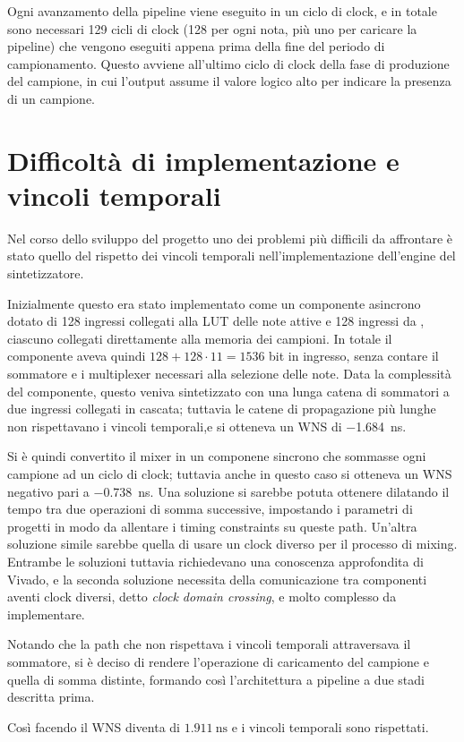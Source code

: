Ogni avanzamento della pipeline viene eseguito in un ciclo di clock,
e in totale sono necessari 129 cicli di clock
(128 per ogni nota, più uno per caricare la pipeline) che vengono eseguiti
appena prima della fine del periodo di campionamento.
Questo avviene all'ultimo ciclo di clock della fase di produzione del
campione, in cui l'output  assume il valore
logico alto per indicare la presenza di un campione.

\section{Difficoltà di implementazione e vincoli temporali}
\label{sec:timing_impl}
Nel corso dello sviluppo del progetto uno dei problemi più difficili da affrontare
è stato quello del rispetto dei vincoli temporali nell'implementazione dell'engine
del sintetizzatore.

Inizialmente questo era stato implementato come un componente asincrono dotato di 
128 ingressi collegati alla LUT delle note attive e 128 ingressi da ,
ciascuno collegati direttamente alla memoria dei campioni.
In totale il componente aveva quindi $128+128\cdot11 = 1536$ bit in ingresso, senza contare
il sommatore e i multiplexer necessari alla selezione delle note.
Data la complessità del componente, questo veniva sintetizzato con una lunga catena
di sommatori a due ingressi collegati in cascata; tuttavia le catene di propagazione più lunghe
non rispettavano i vincoli temporali,e si otteneva un WNS di \SI{-1.684}{\nano\second}.

Si è quindi convertito il mixer in un componene sincrono che sommasse ogni campione
ad un ciclo di clock; tuttavia anche in questo caso si otteneva un WNS negativo pari
a \SI{-0.738}{\nano\second}.
Una soluzione si sarebbe potuta ottenere dilatando il tempo tra due operazioni di somma
successive, impostando i parametri di progetti in modo da allentare i timing constraints
su queste path.
Un'altra soluzione simile sarebbe quella di usare un clock diverso per il processo di mixing.
Entrambe le soluzioni tuttavia richiedevano una conoscenza approfondita di Vivado,
e la seconda soluzione necessita della comunicazione tra componenti aventi 
clock diversi, detto \textit{clock domain crossing}, e molto complesso da
implementare.

Notando che la path che non rispettava i vincoli temporali attraversava
il sommatore, si è deciso di rendere l'operazione di caricamento del campione
e quella di somma distinte, formando così l'architettura a pipeline a due stadi descritta prima.

Così facendo il WNS diventa di $\SI{1.911}{\nano \second}$ e i vincoli temporali sono rispettati.
